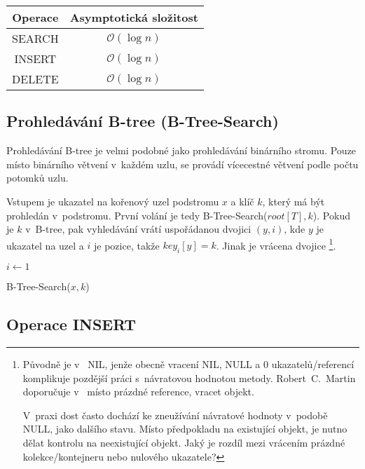 \begin{tabular}{|c|c|}
\hline 
Operace & Asymptotická složitost\tabularnewline
\hline 
\hline 
SEARCH & $\mathcal{O}(\log n)$\tabularnewline
\hline 
INSERT & $\mathcal{O}(\log n)$\tabularnewline
\hline 
DELETE & $\mathcal{O}(\log n)$\tabularnewline
\hline 
\end{tabular}


\subsection{Prohledávání B-tree (B-Tree-Search)}

Prohledávání B-tree je velmi podobné jako prohledávání binárního stromu\@.
Pouze místo binárního větvení v~každém uzlu, se provádí vícecestné
větvení podle počtu potomků uzlu\@.

Vstupem je ukazatel na kořenový uzel podstromu $x$ a klíč $k$, který
má být prohledán v~podstromu\@. První volání je tedy B-Tree-Search($root[T],k$).
Pokud je $k$ v~B-tree, pak vyhledávání vrátí uspořádanou dvojici
$(y,i)$, kde $y$ je ukazatel na uzel a $i$ je pozice, takže $key_{i}[y]=k$\@.
Jinak je vrácena  dvojice%
\footnote{Původně je v~\cite{Cormen:2001:IA:580470} NIL, jenže obecně vracení
NIL, NULL a 0 ukazatelů/referencí komplikuje pozdější práci s~návratovou
hodnotou metody. Robert~C.~Martin doporučuje v~ místo prázdné
reference, vracet  objekt.

V~praxi dost často dochází ke zneužívání návratové hodnoty v~podobě
NULL, jako dalšího stavu. Místo předpokladu na existující objekt,
je nutno dělat kontrolu na neexistující objekt. Jaký je rozdíl mezi
vrácením prázdné kolekce/kontejneru nebo nulového ukazatele?%
}\@.

\begin{algorithm}[t]
\SetAlgoLined
{}

$i \longleftarrow 1$\\

\caption{B-Tree-Search($x,k$)}
\end{algorithm}



\subsection{Operace INSERT}

